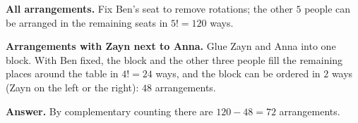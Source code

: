 \textbf{All arrangements.} Fix Ben's seat to remove rotations; the other $5$ people can be arranged in the remaining seats in $5!=120$ ways.

\textbf{Arrangements with Zayn next to Anna.} Glue Zayn and Anna into one block. With Ben fixed, the block and the other three people fill the remaining places around the table in $4!=24$ ways, and the block can be ordered in $2$ ways (Zayn on the left or the right): $48$ arrangements.

\textbf{Answer.} By complementary counting there are $120-48=\boxed{72}$ arrangements.
